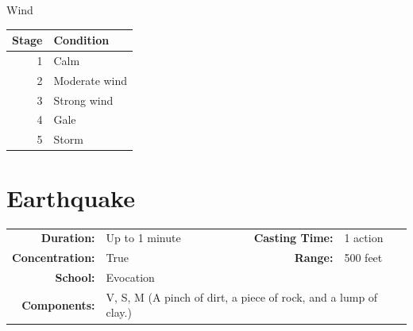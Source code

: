 \documentclass[12pt,showtrims]{memoir}
\begin{document}
\begin{table}[H]
\centering
Wind\\[1pt]
\begin{tabular}{rl}
    \toprule
        Stage & Condition \\
    \midrule
        1  & Calm \\ 
        2  & Moderate wind \\
        3  & Strong wind \\ 
        4  & Gale  \\
        5  & Storm \\
    \bottomrule
\end{tabular}
\end{table}
\newpage
\section*{Earthquake}

{
\small\centering\vspace{-6pt}
\begin{tabular}{rlrl}
\toprule

\textbf{Duration:} & Up to 1 minute &
\textbf{Casting Time:} & 1 action \\
\textbf{Concentration:} & True &
\textbf{Range:} & 500 feet \\
\textbf{School:} & Evocation \\
\textbf{Components:} & \multicolumn{3}{p{0.7\textwidth}}{V, S, M (A pinch of dirt, a piece of rock, and a lump of clay.)}\\

\bottomrule
\end{tabular}
}
\end{document}
